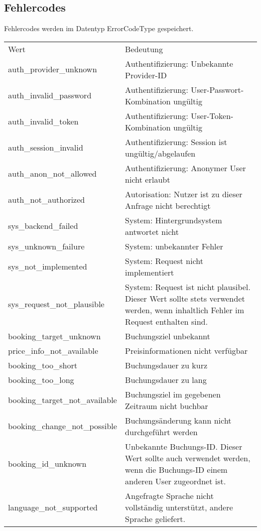 \subsection{Fehlercodes}
Fehlercodes werden im Datentyp ErrorCodeType gespeichert.
\begin{flushleft}
\begin{tabularx}{\linewidth}{l>{\raggedright\arraybackslash}X} 
\toprule
Wert & Bedeutung\\
auth\_provider\_unknown & Authentifizierung: Unbekannte Provider-ID\\
auth\_invalid\_password & Authentifizierung: User-Passwort-Kombination ungültig\\
auth\_invalid\_token & Authentifizierung: User-Token-Kombination ungültig\\
auth\_session\_invalid & Authentifizierung: Session ist ungültig/abgelaufen\\
auth\_anon\_not\_allowed & Authentifizierung: Anonymer User nicht erlaubt\\
auth\_not\_authorized & Autorisation: Nutzer ist zu dieser Anfrage nicht berechtigt\\
sys\_backend\_failed & System: Hintergrundsystem antwortet nicht\\
sys\_unknown\_failure & System: unbekannter Fehler\\
sys\_not\_implemented & System: Request nicht implementiert\\
sys\_request\_not\_plausible & System: Request ist nicht plausibel. Dieser Wert sollte stets verwendet werden, wenn inhaltlich Fehler im Request enthalten sind.\\
booking\_target\_unknown & Buchungsziel unbekannt\\
price\_info\_not\_available & Preisinformationen nicht verfügbar\\
booking\_too\_short & Buchungsdauer zu kurz\\
booking\_too\_long & Buchungsdauer zu lang\\
booking\_target\_not\_available & Buchungsziel im gegebenen Zeitraum nicht buchbar\\
booking\_change\_not\_possible & Buchungsänderung kann nicht durchgeführt werden\\
booking\_id\_unknown & Unbekannte Buchungs-ID. Dieser Wert sollte auch verwendet werden, wenn die Buchungs-ID einem anderen User zugeordnet ist.\\
language\_not\_supported & Angefragte Sprache nicht vollständig unterstützt, andere Sprache geliefert.\\
\bottomrule
\end{tabularx}
\end{flushleft}

